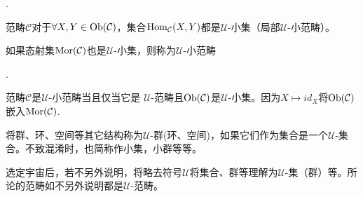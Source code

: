 \begin{Def}.

    范畴$\mathcal{C}$对于$\forall X,Y\in \operatorname{Ob}(\mathcal{C})$，集合$\operatorname{Hom}_{\mathcal{C}}(X,Y)$都是$\mathcal{U}$-小集（局部$\mathcal{U}$-小范畴）。

    如果态射集$\operatorname{Mor}(\mathcal{C})$也是$\mathcal{U}$-小集，则称为$\mathcal{U}$-小范畴
\end{Def}

\begin{Rmk}.

    范畴$\mathcal{C}$是$\mathcal{U}$-小范畴当且仅当它是 $\mathcal{U}$-范畴且$\operatorname{Ob}(\mathcal{C})$是$\mathcal{U}$-小集。因为$X\mapsto id_X$将$\operatorname{Ob}(\mathcal{C})$嵌入$\operatorname{Mor}(\mathcal{C})$.

    将群、环、空间等其它结构称为$\mathcal{U}$-群(环、空间)，如果它们作为集合是一个$\mathcal{U}$-集合。不致混淆时，也简称作小集，小群等等。
\end{Rmk}

\begin{Cvs}[\label{con:U-small}]
    选定宇宙后，若不另外说明，将略去符号$\mathcal{U}$将集合、群等理解为$\mathcal{U}$-集（群）等。所论的范畴如不另外说明都是$\mathcal{U}$-范畴。
\end{Cvs}

